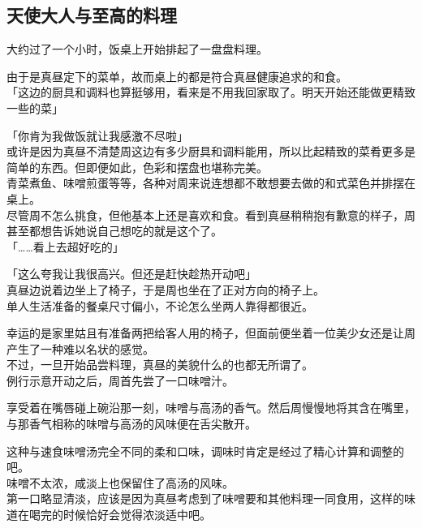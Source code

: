 \subsection{天使大人与至高的料理}

大约过了一个小时，饭桌上开始排起了一盘盘料理。

由于是真昼定下的菜单，故而桌上的都是符合真昼健康追求的和食。\\

「这边的厨具和调料也算挺够用，看来是不用我回家取了。明天开始还能做更精致一些的菜」

「你肯为我做饭就让我感激不尽啦」\\

或许是因为真昼不清楚周这边有多少厨具和调料能用，所以比起精致的菜肴更多是简单的东西。但即便如此，色彩和摆盘也堪称完美。\\

青菜煮鱼、味噌煎蛋等等，各种对周来说连想都不敢想要去做的和式菜色并排摆在桌上。\\

尽管周不怎么挑食，但他基本上还是喜欢和食。看到真昼稍稍抱有歉意的样子，周甚至都想告诉她说自己想吃的就是这个了。\\

「……看上去超好吃的」

「这么夸我让我很高兴。但还是赶快趁热开动吧」\\

真昼边说着边坐上了椅子，于是周也坐在了正对方向的椅子上。\\

单人生活准备的餐桌尺寸偏小，不论怎么坐两人靠得都很近。

幸运的是家里姑且有准备两把给客人用的椅子，但面前便坐着一位美少女还是让周产生了一种难以名状的感觉。\\

不过，一旦开始品尝料理，真昼的美貌什么的也都无所谓了。\\

例行示意开动之后，周首先尝了一口味噌汁。

享受着在嘴唇碰上碗沿那一刻，味噌与高汤的香气。然后周慢慢地将其含在嘴里，与那香气相称的味噌与高汤的风味便在舌尖散开。

这种与速食味噌汤完全不同的柔和口味，调味时肯定是经过了精心计算和调整的吧。\\

味噌不太浓，咸淡上也保留住了高汤的风味。\\

第一口略显清淡，应该是因为真昼考虑到了味噌要和其他料理一同食用，这样的味道在喝完的时候恰好会觉得浓淡适中吧。\\


